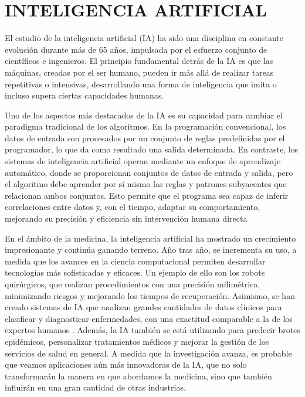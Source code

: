 \section{INTELIGENCIA ARTIFICIAL}

El estudio de la inteligencia artificial (IA) ha sido una disciplina en constante
evolución durante más de 65 años, impulsada por el esfuerzo conjunto de científicos e
ingenieros. El principio fundamental detrás de la IA es que las máquinas, creadas por el
ser humano, pueden ir más allá de realizar tareas repetitivas o intensivas, desarrollando
una forma de inteligencia que imita o incluso supera ciertas capacidades humanas.

Uno de los aspectos más destacados de la IA es su capacidad para cambiar el paradigma
tradicional de los algoritmos. En la programación convencional, los datos de entrada son
procesados por un conjunto de reglas predefinidas por el programador, lo que da como
resultado una salida determinada. En contraste, los sistemas de inteligencia artificial
operan mediante un enfoque de aprendizaje automático, donde se proporcionan conjuntos de
datos de entrada y salida, pero el algoritmo debe aprender por sí mismo las reglas y
patrones subyacentes que relacionan ambos conjuntos. Esto permite que el programa sea
capaz de inferir correlaciones entre datos y, con el tiempo, adaptar su comportamiento,
mejorando su precisión y eficiencia sin intervención humana directa

En el ámbito de la medicina, la inteligencia artificial ha mostrado un crecimiento
impresionante y continúa ganando terreno. Año tras año, se incrementa su uso, a medida que
los avances en la ciencia computacional permiten desarrollar tecnologías más sofisticadas
y eficaces. Un ejemplo de ello son los robots quirúrgicos, que realizan procedimientos con
una precisión milimétrica, minimizando riesgos y mejorando los tiempos de recuperación.
Asimismo, se han creado sistemas de IA que analizan grandes cantidades de datos clínicos
para clasificar y diagnosticar enfermedades, con una exactitud comparable a la de los
expertos humanos . Además, la IA también se está
utilizando para predecir brotes epidémicos, personalizar tratamientos médicos y mejorar la
gestión de los servicios de salud en general. A medida que la investigación avanza, es
probable que veamos aplicaciones aún más innovadoras de la IA, que no solo transformarán
la manera en que abordamos la medicina, sino que también influirán en una gran cantidad de
otras industrias.

